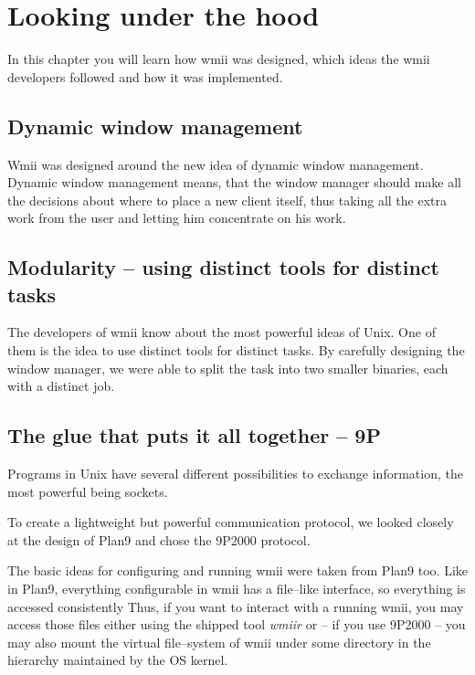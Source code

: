 \documentclass[12pt,a4paper]{article} %
\begin{document}
\section{Looking under the hood}

  In this chapter you will learn how wmii was designed, which ideas
  the wmii developers followed and how it was implemented.

  \subsection{Dynamic window management}

    Wmii was designed around the new idea of dynamic window
    management. Dynamic window management means, that the window
    manager should make all the decisions about where to place a new
    client itself, thus taking all the extra work from the user and
    letting him concentrate on his work.

  \subsection{Modularity -- using distinct tools for distinct tasks}

    The developers of wmii know about the most powerful ideas of
    Unix. One of them is the idea to use distinct tools for distinct
    tasks. By carefully designing the window manager, we were able to
    split the task into two smaller binaries, each with a distinct
    job.
  
  \subsection{The glue that puts it all together -- 9P}

    Programs in Unix have several different possibilities to exchange
    information, the most powerful being sockets.

    To create a lightweight but powerful communication protocol, we
    looked closely at the design of Plan9 and chose the 9P2000
    protocol.

    The basic ideas for configuring and running wmii were taken from
    Plan9 too. Like in Plan9, everything configurable in wmii has a
    file--like interface, so everything is accessed consistently Thus,
    if you want to interact with a running wmii, you may access those
    files either using the shipped tool \emph{wmiir} or -- if you use
    9P2000 -- you may also mount the virtual file--system of wmii under
    some directory in the hierarchy maintained by the OS kernel.
\end{document}
